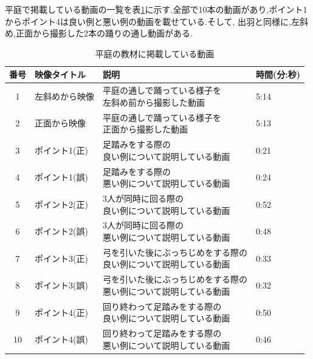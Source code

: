 \documentclass[12pt]{ltjsarticle}
\begin{document}
\begin{table}[h]
{\begin{tabular}{clll}
  

    \hline
   \end{tabular}
  }
 \end{table}
 
 \clearpage

 平庭で掲載している動画の一覧を表\ref{table:hhiraniwa}に示す.全部で10本の動画があり,ポイント1からポイント4は良い例と悪い例の動画を載せている.そして,
 出羽と同様に,左斜め,正面から撮影した2本の踊りの通し動画がある.
 
 \begin{table}[h]
   \caption{平庭の教材に掲載している動画}
   \label{table:hhiraniwa}
   \centering
   {\renewcommand\arraystretch{2.0}
    \begin{tabular}{clll}
     \hline
     番号 & 映像タイトル & 説明 & 時間(分:秒) \\
   
     \hline \hline
     1 &  左斜めから映像 &  \shortstack{平庭の通しで踊っている様子を\\左斜め前から撮影した動画} & 5:14 \\
     2 &  正面から映像 &  \shortstack{平庭の通しで踊っている様子を\\正面から撮影した動画} & 5:13 \\
     3 &  ポイント1(正) &  \shortstack{足踏みをする際の\\良い例について説明している動画} & 0:21 \\
     4 &  ポイント1(誤) &  \shortstack{足踏みをする際の\\悪い例について説明している動画} & 0:24 \\ 
     5 &  ポイント2(正) &  \shortstack{3人が同時に回る際の\\良い例について説明している動画} & 0:52 \\ 
     6 &  ポイント2(誤) &  \shortstack{3人が同時に回る際の\\悪い例について説明している動画} & 0:48 \\ 
     7 &  ポイント3(正) &  \shortstack{弓を引いた後にぶっちじめをする際の\\良い例について説明している動画} & 0:33 \\ 
     8 &  ポイント3(誤) &  \shortstack{弓を引いた後にぶっちじめをする際の\\悪い例について説明している動画} & 0:32 \\ 
     9 &  ポイント4(正) &  \shortstack{回り終わって足踏みをする際の\\良い例について説明している動画} & 0:50 \\ 
     10 &  ポイント4(誤) &  \shortstack{回り終わって足踏みをする際の\\悪い例について説明している動画} & 0:46 \\ 
   
 
 
 
 
   
 
     \hline
    \end{tabular}
   }
  \end{table}
 
\end{document}
